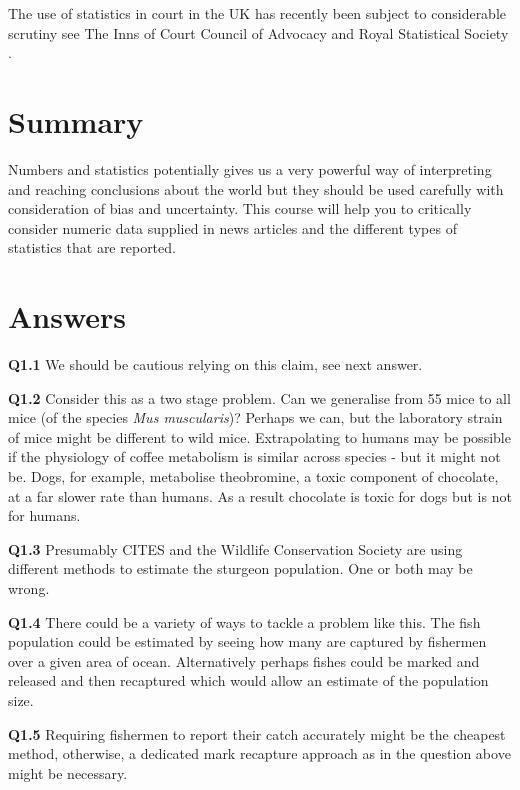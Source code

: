 \documentclass[
  oneside]{krantz}
\begin{document}
The use of statistics in court in the UK has recently been subject to considerable scrutiny see The Inns of Court Council of Advocacy and Royal Statistical Society \citeyearpar{innsof2017court}.

\hypertarget{SUMintro}{%
\section{Summary}\label{SUMintro}}

Numbers and statistics potentially gives us a very powerful way of interpreting and reaching conclusions about the world but they should be used carefully with consideration of bias and uncertainty. This course will help you to critically consider numeric data supplied in news articles and the different types of statistics that are reported.

\hypertarget{ANSintro}{%
\section{Answers}\label{ANSintro}}

\textbf{Q1.1} We should be cautious relying on this claim, see next answer.

\textbf{Q1.2} Consider this as a two stage problem. Can we generalise from 55 mice to all mice (of the species \emph{Mus muscularis})? Perhaps we can, but the laboratory strain of mice might be different to wild mice. Extrapolating to humans may be possible if the physiology of coffee metabolism is similar across species - but it might not be. Dogs, for example, metabolise theobromine, a toxic component of chocolate, at a far slower rate than humans. As a result chocolate is toxic for dogs but is not for humans.

\textbf{Q1.3} Presumably CITES and the Wildlife Conservation Society are using different methods to estimate the sturgeon population. One or both may be wrong.

\textbf{Q1.4} There could be a variety of ways to tackle a problem like this. The fish population could be estimated by seeing how many are captured by fishermen over a given area of ocean. Alternatively perhaps fishes could be marked and released and then recaptured which would allow an estimate of the population size.

\textbf{Q1.5} Requiring fishermen to report their catch accurately might be the cheapest method, otherwise, a dedicated mark recapture approach as in the question above might be necessary.
\end{document}
